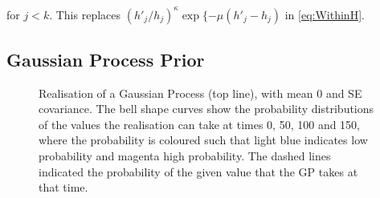 \documentclass[../main.tex]{subfiles}
\begin{document}
for $j<k$. This replaces $ (h'_j/h_j)^\kappa \exp \{ -\mu(h'_j - h_j)$ in \eqref{eq:WithinH}.


\subsection{Gaussian Process Prior}
  \begin{figure}[t]
   \hrulefill
   \begin{center} 
    \end{center}     
    \caption{Realisation of a Gaussian Process (top line), with mean 0 and SE covariance. The bell shape curves show the probability distributions of the values the realisation can take at times 0, 50, 100 and 150, where the probability is coloured such that light blue indicates low probability and magenta high probability. The dashed lines indicated the probability of the given value that the GP takes at that time.   }
    \hrulefill
    \label{fig:BasicGP}
    \end{figure}
    
\end{document}
